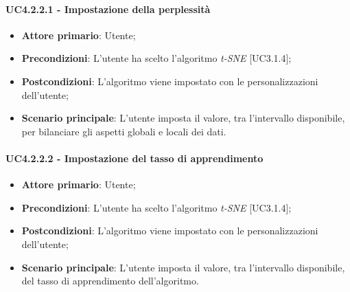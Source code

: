 	
\paragraph{UC4.2.2.1 - Impostazione della perplessità}
\begin{itemize}
	\item \textbf{Attore primario}: Utente;
	
	\item \textbf{Precondizioni}: L'utente ha scelto l'algoritmo \textit{t-SNE} [UC3.1.4];
	
	\item \textbf{Postcondizioni}: L'algoritmo viene impostato con le personalizzazioni dell'utente;
	
	\item \textbf{Scenario principale}: L'utente imposta il valore, tra l'intervallo disponibile, per bilanciare gli aspetti globali e locali dei dati.

\end{itemize}
	
\paragraph{UC4.2.2.2 - Impostazione del tasso di apprendimento}
\begin{itemize}
	\item \textbf{Attore primario}: Utente;
	
	\item \textbf{Precondizioni}: L'utente ha scelto l'algoritmo \textit{t-SNE} [UC3.1.4];
	
	\item \textbf{Postcondizioni}: L'algoritmo viene impostato con le personalizzazioni dell'utente;
	
	\item \textbf{Scenario principale}: L'utente imposta il valore, tra l'intervallo disponibile, del tasso di apprendimento dell'algoritmo.

\end{itemize}
